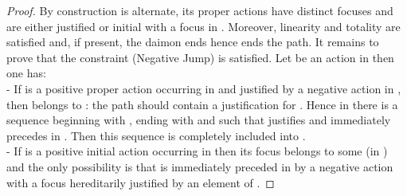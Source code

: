 \documentclass{LMCS}
\begin{document}
\begin{proof}
By construction   is alternate, its proper actions have distinct focuses and are  either justified or   initial with a focus in . Moreover, linearity and totality are satisfied and, if present, the daimon ends  hence ends the path. It remains to prove that the constraint (Negative Jump) is satisfied. Let  be an action in  then one has:\\
- If   is a positive proper action occurring in  and  justified by a negative
action  in , then  belongs to : the path  should contain a justification for . Hence in  there is a sequence
  beginning with
, ending with  and such that
 justifies  and
 immediately precedes  in . Then  this sequence is completely included  into . \\
- If   is a positive initial action occurring in  then its focus belongs to some  (in ) and  the only possibility is that   is immediately preceded in
 by a negative action with a focus hereditarily justified by an element
of .
 \end{proof}
\end{document}
